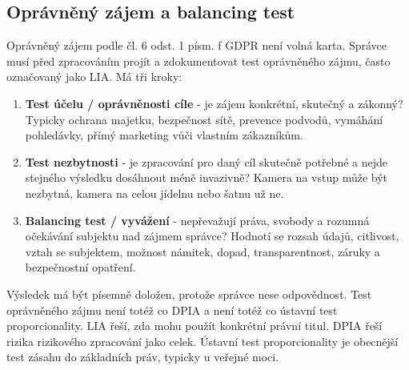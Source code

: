 \subsection*{Oprávněný zájem a balancing test}
Oprávněný zájem podle čl. 6 odst. 1 písm. f GDPR není volná karta. Správce musí před zpracováním projít a zdokumentovat test oprávněného zájmu, často označovaný jako LIA. Má tři kroky:
\begin{enumerate}
  \item \textbf{Test účelu / oprávněnosti cíle} - je zájem konkrétní, skutečný a zákonný? Typicky ochrana majetku, bezpečnost sítě, prevence podvodů, vymáhání pohledávky, přímý marketing vůči vlastním zákazníkům.
  \item \textbf{Test nezbytnosti} - je zpracování pro daný cíl skutečně potřebné a nejde stejného výsledku dosáhnout méně invazivně? Kamera na vstup může být nezbytná, kamera na celou jídelnu nebo šatnu už ne.
  \item \textbf{Balancing test / vyvážení} - nepřevažují práva, svobody a rozumná očekávání subjektu nad zájmem správce? Hodnotí se rozsah údajů, citlivost, vztah se subjektem, možnost námitek, dopad, transparentnost, záruky a bezpečnostní opatření.
\end{enumerate}

Výsledek má být písemně doložen, protože správce nese odpovědnost. Test oprávněného zájmu není totéž co DPIA a není totéž co ústavní test proporcionality. LIA řeší, zda mohu použít konkrétní právní titul. DPIA řeší rizika rizikového zpracování jako celek. Ústavní test proporcionality je obecnější test zásahu do základních práv, typicky u veřejné moci.



